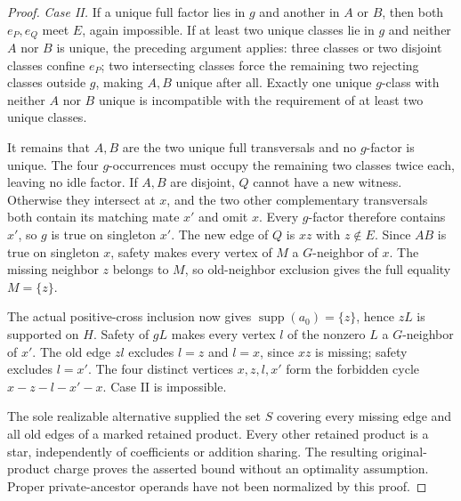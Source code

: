 \documentclass[11pt]{article}
\newcommand{\supp}{\operatorname{supp}}
\theoremstyle{definition}
\theoremstyle{remark}
\begin{document}
\begin{proof}
\emph{Case II.} If a unique full factor lies in $g$ and another in $A$ or $B$, then both $e_P,e_Q$ meet $E$, again impossible. If at least two unique classes lie in $g$ and neither $A$ nor $B$ is unique, the preceding argument applies: three classes or two disjoint classes confine $e_P$; two intersecting classes force the remaining two rejecting classes outside $g$, making $A,B$ unique after all. Exactly one unique $g$-class with neither $A$ nor $B$ unique is incompatible with the requirement of at least two unique classes.

It remains that $A,B$ are the two unique full transversals and no $g$-factor is unique. The four $g$-occurrences must occupy the remaining two classes twice each, leaving no idle factor. If $A,B$ are disjoint, $Q$ cannot have a new witness. Otherwise they intersect at $x$, and the two other complementary transversals both contain its matching mate $x'$ and omit $x$. Every $g$-factor therefore contains $x'$, so $g$ is true on singleton $x'$. The new edge of $Q$ is $xz$ with $z\notin E$. Since $AB$ is true on singleton $x$, safety makes every vertex of $M$ a $G$-neighbor of $x$. The missing neighbor $z$ belongs to $M$, so old-neighbor exclusion gives the full equality $M=\{z\}$.

The actual positive-cross inclusion now gives $\supp(a_0)=\{z\}$, hence $zL$ is supported on $H$. Safety of $gL$ makes every vertex $l$ of the nonzero $L$ a $G$-neighbor of $x'$. The old edge $zl$ excludes $l=z$ and $l=x$, since $xz$ is missing; safety excludes $l=x'$. The four distinct vertices $x,z,l,x'$ form the forbidden cycle $x-z-l-x'-x$. Case II is impossible.

The sole realizable alternative supplied the set $S$ covering every missing edge and all old edges of a marked retained product. Every other retained product is a star, independently of coefficients or addition sharing. The resulting original-product charge proves the asserted bound without an optimality assumption. Proper private-ancestor operands have not been normalized by this proof.
\end{proof}
\end{document}
